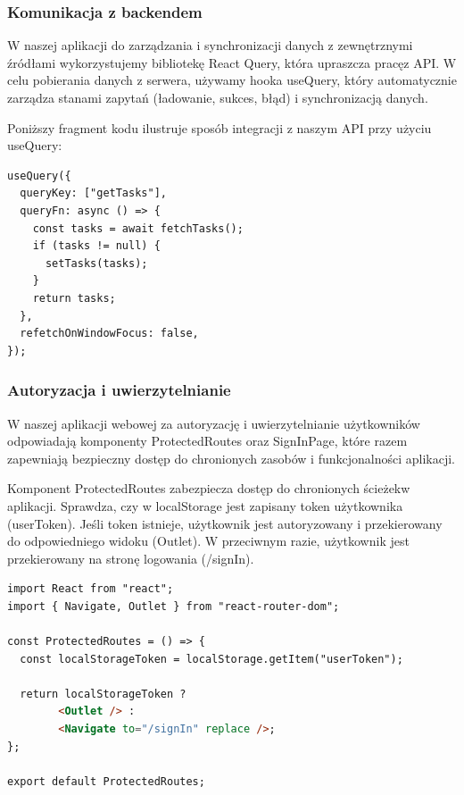 \subsubsection{Komunikacja z backendem}


\noindent W naszej aplikacji do zarządzania i synchronizacji danych z zewnętrznymi źródłami wykorzystujemy bibliotekę React Query, która upraszcza pracę\linebreak z API. W celu pobierania danych z serwera, używamy hooka useQuery, który automatycznie zarządza stanami zapytań (ładowanie, sukces, błąd) i synchronizacją danych.

\noindent Poniższy fragment kodu ilustruje sposób integracji z naszym API przy użyciu useQuery:

\begin{lstlisting}[language=html, caption=useQuery example]
useQuery({
  queryKey: ["getTasks"],
  queryFn: async () => {
    const tasks = await fetchTasks();
    if (tasks != null) {
      setTasks(tasks);
    }
    return tasks;
  },
  refetchOnWindowFocus: false,
});
\end{lstlisting}

\subsubsection{Autoryzacja i uwierzytelnianie}

W naszej aplikacji webowej za autoryzację i uwierzytelnianie użytkowników odpowiadają komponenty ProtectedRoutes oraz SignInPage, które razem zapewniają bezpieczny dostęp do chronionych zasobów i funkcjonalności aplikacji.
\\


\noindent Komponent ProtectedRoutes zabezpiecza dostęp do chronionych ścieżek\linebreak w aplikacji. Sprawdza, czy w localStorage jest zapisany token użytkownika (userToken). Jeśli token istnieje, użytkownik jest autoryzowany i przekierowany do odpowiedniego widoku (Outlet). W przeciwnym razie, użytkownik jest przekierowany na stronę logowania (/signIn).

\begin{lstlisting}[language=html, caption=ProtectedRoutes example]
import React from "react";
import { Navigate, Outlet } from "react-router-dom";

const ProtectedRoutes = () => {
  const localStorageToken = localStorage.getItem("userToken");

  return localStorageToken ?
        <Outlet /> :
        <Navigate to="/signIn" replace />;
};

export default ProtectedRoutes;
\end{lstlisting}


